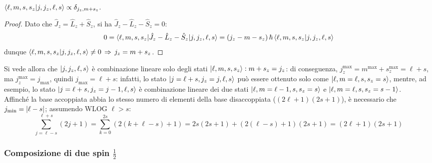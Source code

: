 \begin{proposition}
	$ \braket{\ell,m,s,s_z | j,j_z,\ell,s} \propto \delta_{j_z,m + s_z} $.
\end{proposition}
\begin{proof}
	Dato che $ \hat{J}_z = \hat{L}_z + \hat{S}_z $, si ha $ \hat{J}_z - \hat{L}_z - \hat{S}_z = 0 $:
	\begin{equation*}
		0 = \braket{\ell,m,s,s_z | \hat{J}_z - \hat{L}_z - \hat{S}_z | j,j_z,\ell,s} = \left( j_z - m - s_z \right) \hbar \braket{\ell,m,s,s_z | j,j_z,\ell,s}
	\end{equation*}
	dunque $ \braket{\ell,m,s,s_z | j,j_z,\ell,s} \neq 0 \,\Rightarrow\, j_z = m + s_z $.
\end{proof}
Si vede allora che $ \ket{j,j_z,\ell,s} $ è combinazione lineare solo degli stati $ \ket{\ell,m,s,s_z} : m + s_z = j_z $: di conseguenza, $ j_z^{\text{max}} = m^{\text{max}} + s_z^{\text{max}} = \ell + s $, ma $ j_z^{\text{max}} = j_{\text{max}} $, quindi $ j_{\text{max}} = \ell + s $: infatti, lo stato $ \ket{j = \ell + s, j_z = j, \ell, s} $ può essere ottenuto solo come $ \ket{\ell,m = \ell,s,s_z = s} $, mentre, ad esempio, lo stato $ \ket{j = \ell + s, j_z = j - 1, \ell, s} $ è combinazione lineare dei due stati $ \ket{\ell, m = \ell - 1, s, s_z = s} $ e $ \ket{\ell, m = \ell, s, s_z = s - 1} $.\\
Affinché la base accoppiata abbia lo stesso numero di elementi della base disaccoppiata ($ (2\ell + 1)(2s + 1) $), è necessario che $ j_{\text{min}} = \left\lvert\ell - s\right\rvert $; assumendo WLOG $ \ell > s $:
\begin{equation*}
	\sum_{j = \ell - s}^{\ell + s} (2j + 1) = \sum_{k = 0}^{2s} \left( 2(k + \ell - s) + 1 \right) = 2s (2s + 1) + \left( 2(\ell - s) +1 \right) (2s + 1) = (2\ell + 1)(2s + 1)
\end{equation*}

\subsubsection{Composizione di due spin \texorpdfstring{$ \frac{1}{2} $}{TEXXT}}

